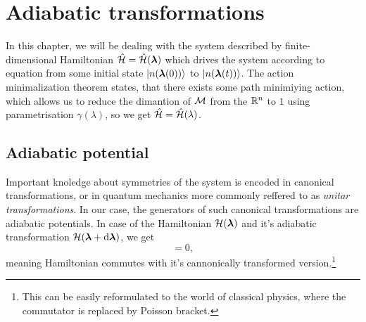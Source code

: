 \section{Adiabatic transformations}
In this chapter, we will be dealing with the system described by finite-dimensional Hamiltonian $\hat{\mathcal{H}}=\hat{\mathcal{H}}({\bm\lambda})$ which drives the system according to \Schrodinger equation from some initial state $\ket{n({\bm\lambda}(0))}$ to $\ket{n({\bm\lambda}(t))}$. The action minimalization theorem states, that there exists some path minimiying action, which allows us to reduce the dimantion of $\mathcal{M}$ from the $\mathbb{R}^n$ to $1$ using parametrisation $\gamma(\lambda)$, so we get $\hat{\mathcal{H}}=\hat{\mathcal{H}}(\lambda)$.

\subsection{Adiabatic potential}
Important knoledge about symmetries of the system is encoded in canonical transformations, or in quantum mechanics more commonly reffered to as \emph{unitar transformations}. In our case, the generators of such canonical transformations are adiabatic potentials. In case of the Hamiltonian $\mathcal{H}({\bm\lambda})$ and it's adiabatic transformation $\mathcal{H}({\bm\lambda}+\mathrm{d} {\bm\lambda})$, we get
\begin{equation}
    [\HH(\llambda),\HH(\llambda+\d \llambda)]=0,
\end{equation}
meaning Hamiltonian commutes with it's cannonically transformed version.\footnote{This can be easily reformulated to the world of classical physics, where the commutator is replaced by Poisson bracket.}



